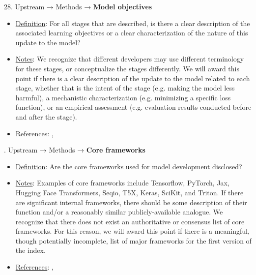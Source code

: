 28. Upstream → Methods → \textbf{Model objectives}
\vspace{-\parskip}
\begin{itemize}
\item
\underline{Definition}: For all stages that are described, is there a clear description of the associated learning objectives or a clear characterization of the nature of this update to the model?
\item
\underline{Notes}: We recognize that different developers may use different terminology for these stages, or conceptualize the stages differently. We will award this point if there is a clear description of the update to the model related to each stage, whether that is the intent of the stage (e.g. making the model less harmful), a mechanistic characterization (e.g. minimizing a specific loss function), or an empirical assessment (e.g. evaluation results conducted before and after the stage).
\item
\underline{References}: \citet{mitchell2019model}, \citet{chung2022scaling}
\end{itemize} \vspace{\baselineskip}


. Upstream → Methods → \textbf{Core frameworks}
\vspace{-\parskip}
\begin{itemize}
\item
\underline{Definition}: Are the core frameworks used for model development disclosed?
\item
\underline{Notes}: Examples of core frameworks include Tensorflow, PyTorch, Jax, Hugging Face Transformers, Seqio, T5X, Keras, SciKit, and Triton. If there are significant internal frameworks, there should be some description of their function and/or a reasonably similar publicly-available analogue. We recognize that there does not exist an authoritative or consensus list of core frameworks. For this reason, we will award this point if there is a meaningful, though potentially incomplete, list of major frameworks for the first version of the index.
\item
\underline{References}: \citet{mitchell2019model}, \citet{chung2022scaling}
\end{itemize} \vspace{\baselineskip}


